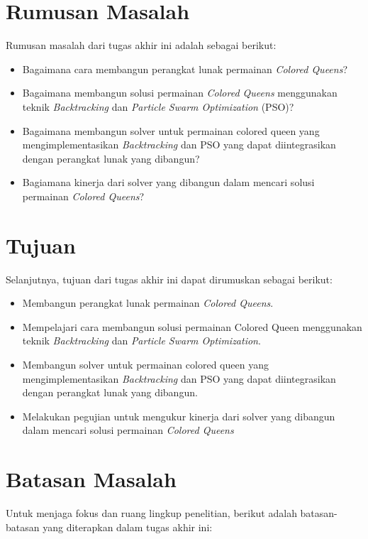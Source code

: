 \section{Rumusan Masalah}
\label{sec:rumusan}
Rumusan masalah dari tugas akhir ini adalah sebagai berikut:
\begin{itemize}	
	\item Bagaimana cara membangun perangkat lunak permainan \textit{Colored Queens}?
	\item Bagaimana membangun solusi permainan \textit{Colored Queens} menggunakan teknik \textit{Backtracking} dan \textit{Particle Swarm Optimization} (PSO)?
	\item Bagaimana membangun solver untuk permainan colored queen yang mengimplementasikan \textit{Backtracking} dan PSO yang dapat diintegrasikan dengan perangkat lunak yang dibangun?
	\item Bagiamana kinerja dari solver yang dibangun dalam mencari solusi permainan \textit{Colored Queens}?
\end{itemize}

\section{Tujuan}
\label{sec:tujuan}
Selanjutnya, tujuan dari tugas akhir ini dapat dirumuskan sebagai berikut:
\begin{itemize}	
	\item Membangun perangkat lunak permainan \textit{Colored Queens}.
	\item Mempelajari cara membangun solusi permainan Colored Queen menggunakan teknik \textit{Backtracking} dan \textit{Particle Swarm Optimization}.
	\item Membangun solver untuk permainan colored queen yang mengimplementasikan \textit{Backtracking} dan PSO yang dapat diintegrasikan dengan perangkat lunak yang dibangun.
	\item Melakukan pegujian untuk mengukur kinerja dari solver yang dibangun dalam mencari solusi permainan \textit{Colored Queens}
\end{itemize}

\section{Batasan Masalah}
\label{sec:batasan}

Untuk menjaga fokus dan ruang lingkup penelitian, berikut adalah batasan-batasan yang diterapkan dalam tugas akhir ini:

